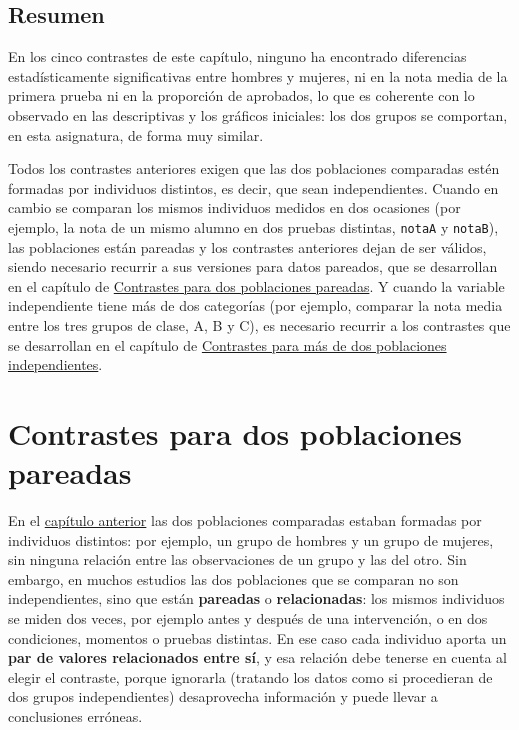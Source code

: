 \documentclass[
  spanish,
  a4paper,
]{scrreport}
\theoremstyle{definition}
\theoremstyle{definition}
\theoremstyle{remark}
\begin{document}
\section{Resumen}\label{resumen}

En los cinco contrastes de este capítulo, ninguno ha encontrado
diferencias estadísticamente significativas entre hombres y mujeres, ni
en la nota media de la primera prueba ni en la proporción de aprobados,
lo que es coherente con lo observado en las descriptivas y los gráficos
iniciales: los dos grupos se comportan, en esta asignatura, de forma muy
similar.

Todos los contrastes anteriores exigen que las dos poblaciones
comparadas estén formadas por individuos distintos, es decir, que sean
independientes. Cuando en cambio se comparan los mismos individuos
medidos en dos ocasiones (por ejemplo, la nota de un mismo alumno en dos
pruebas distintas, \texttt{notaA} y \texttt{notaB}), las poblaciones
están pareadas y los contrastes anteriores dejan de ser válidos, siendo
necesario recurrir a sus versiones para datos pareados, que se
desarrollan en el capítulo de
\href{13-contrastes-dos-poblaciones-pareadas.qmd}{Contrastes para dos
poblaciones pareadas}. Y cuando la variable independiente tiene más de
dos categorías (por ejemplo, comparar la nota media entre los tres
grupos de clase, A, B y C), es necesario recurrir a los contrastes que
se desarrollan en el capítulo de
\href{14-contrastes-mas-dos-poblaciones-independientes.qmd}{Contrastes
para más de dos poblaciones independientes}.

\chapter{Contrastes para dos poblaciones
pareadas}\label{contrastes-para-dos-poblaciones-pareadas}

En el \hyperref[contrastes-para-dos-poblaciones-independientes]{capítulo
anterior} las dos poblaciones comparadas estaban formadas por individuos
distintos: por ejemplo, un grupo de hombres y un grupo de mujeres, sin
ninguna relación entre las observaciones de un grupo y las del otro. Sin
embargo, en muchos estudios las dos poblaciones que se comparan no son
independientes, sino que están \textbf{pareadas} o
\textbf{relacionadas}: los mismos individuos se miden dos veces, por
ejemplo antes y después de una intervención, o en dos condiciones,
momentos o pruebas distintas. En ese caso cada individuo aporta un
\textbf{par de valores relacionados entre sí}, y esa relación debe
tenerse en cuenta al elegir el contraste, porque ignorarla (tratando los
datos como si procedieran de dos grupos independientes) desaprovecha
información y puede llevar a conclusiones erróneas.
\end{document}
